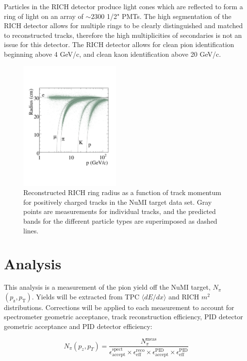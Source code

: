 \documentclass[%
aps, prd, reprint, show pacs, preprint numbers, ams math, amssymb, superscriptaddress, linenumbers]{revtex4-1}
\newcommand{\dedx}{\ensuremath{\langle dE/dx\rangle}\xspace}
\def\pzpt{$(p_\mathrm{z},p_\mathrm{T})$\xspace}
\begin{document}
Particles in the RICH detector produce light cones which are reflected to form a ring of light on an array of $\sim2300$ 1/2" PMTs.  The high segmentation of the RICH detector allows for multiple rings to be clearly distinguished and matched to reconstructed tracks, therefore the high multiplicities of secondaries is not an issue for this detector.  The RICH detector allows for clean pion identification beginning above 4 GeV/c, and clean kaon identification above 20 GeV/c.

\begin{figure}[thp]
   \centering
   \includegraphics[width=0.45\textwidth]{RICHNuMIPosTrack2}
   \caption{Reconstructed RICH ring radius as a function of track momentum for positively charged tracks in the NuMI target data set.  Gray points are measurements for individual tracks, and the predicted bands for the different particle types are superimposed as dashed lines.}
   \label{fig:richRingVsMom}
\end{figure}


\section{Analysis}

This analysis is a measurement of the pion yield off the NuMI target, $N_\pi$\pzpt.  Yields will be extracted from TPC \dedx and RICH $m^2$ distributions.  Corrections will be applied to each measurement to account for spectrometer geometric acceptance, track reconstruction efficiency, PID detector geometric acceptance and PID detector efficiency:

\begin{equation}
N_\pi(p_z,p_T) = \frac{N_\pi^\mathrm{meas}}{\epsilon^\mathrm{spect}_\mathrm{accept} \times \epsilon^\mathrm{reco}_\mathrm{eff} \times \epsilon^\mathrm{PID}_\mathrm{accept} \times \epsilon^\mathrm{PID}_\mathrm{eff}}
\end{equation}
\end{document}
